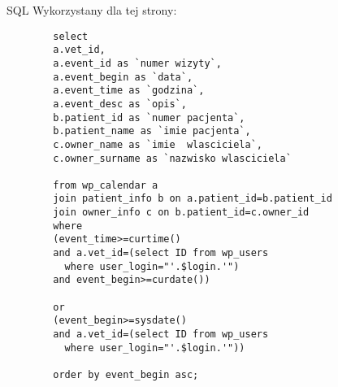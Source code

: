 \documentclass[10pt,a4paper]{article}
\begin{document}
		SQL Wykorzystany dla tej strony:
		
		\begin{lstlisting}
		select 
		a.vet_id,
		a.event_id as `numer wizyty`,
		a.event_begin as `data`,
		a.event_time as `godzina`,
		a.event_desc as `opis`,
		b.patient_id as `numer pacjenta`,
		b.patient_name as `imie pacjenta`,
		c.owner_name as `imie  wlasciciela`,
		c.owner_surname as `nazwisko wlasciciela`
		
		from wp_calendar a
		join patient_info b on a.patient_id=b.patient_id
		join owner_info c on b.patient_id=c.owner_id
		where 
		(event_time>=curtime() 
		and a.vet_id=(select ID from wp_users 
		  where user_login="'.$login.'") 
		and event_begin>=curdate())
		
		or 
		(event_begin>=sysdate()
		and a.vet_id=(select ID from wp_users
		  where user_login="'.$login.'"))
		
		order by event_begin asc;
		\end{lstlisting}
		
		
		
\end{document}
